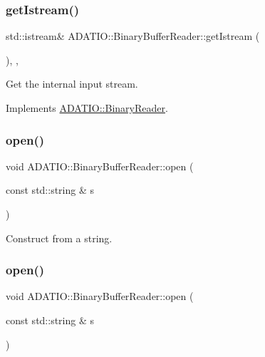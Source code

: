 \subsubsection{\texorpdfstring{getIstream()}{getIstream()}\hspace{0.1cm}{\footnotesize\ttfamily [3/3]}}
{\footnotesize\ttfamily std\+::istream\& A\+D\+A\+T\+I\+O\+::\+Binary\+Buffer\+Reader\+::get\+Istream (\begin{DoxyParamCaption}{ }\end{DoxyParamCaption})\hspace{0.3cm}{\ttfamily [inline]}, {\ttfamily [protected]}, {\ttfamily [virtual]}}



Get the internal input stream. 



Implements \mbox{\hyperlink{classADATIO_1_1BinaryReader_aa34e73d5f1e6b2b3b48c27e97f6a85a0}{A\+D\+A\+T\+I\+O\+::\+Binary\+Reader}}.

\mbox{\label{classADATIO_1_1BinaryBufferReader_af56c8d00474a1f38f38267c45aa7b433}} 
\subsubsection{\texorpdfstring{open()}{open()}\hspace{0.1cm}{\footnotesize\ttfamily [1/3]}}
{\footnotesize\ttfamily void A\+D\+A\+T\+I\+O\+::\+Binary\+Buffer\+Reader\+::open (\begin{DoxyParamCaption}\item[{const std\+::string \&}]{s }\end{DoxyParamCaption})}



Construct from a string. 

\mbox{\label{classADATIO_1_1BinaryBufferReader_af56c8d00474a1f38f38267c45aa7b433}} 
\subsubsection{\texorpdfstring{open()}{open()}\hspace{0.1cm}{\footnotesize\ttfamily [2/3]}}
{\footnotesize\ttfamily void A\+D\+A\+T\+I\+O\+::\+Binary\+Buffer\+Reader\+::open (\begin{DoxyParamCaption}\item[{const std\+::string \&}]{s }\end{DoxyParamCaption})}



